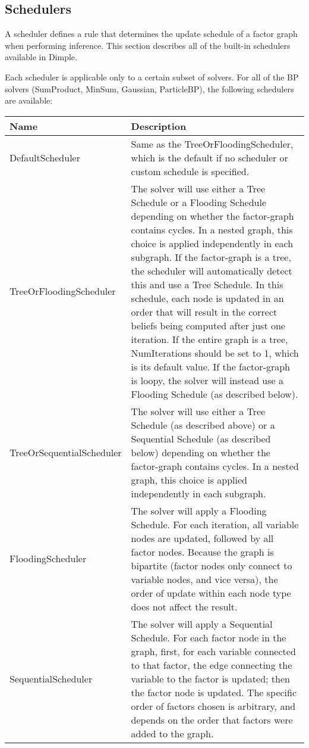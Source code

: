 \subsection{Schedulers}
\label{sec:Schedulers}

A scheduler defines a rule that determines the update schedule of a factor graph when performing inference.  This section describes all of the built-in schedulers available in Dimple.

Each scheduler is applicable only to a certain subset of solvers.  For all of the BP solvers (SumProduct, MinSum, Gaussian, ParticleBP), the following schedulers are available:

\begin{longtable}{l p{4in}}
\textbf{Name} & \textbf{Description} \\ \hline \hline
%
\textsf{DefaultScheduler} & Same as the TreeOrFloodingScheduler, which is the default if no scheduler or custom schedule is specified. \\ \hline
%
\textsf{TreeOrFloodingScheduler} & The solver will use either a Tree Schedule or a Flooding Schedule depending on whether the factor-graph contains cycles.  In a nested graph, this choice is applied independently in each subgraph.  If the factor-graph is a tree, the scheduler will automatically detect this and use a Tree Schedule.  In this schedule, each node is updated in an order that will result in the correct beliefs being computed after just one iteration.  If the entire graph is a tree, NumIterations should be set to 1, which is its default value.  If the factor-graph is loopy, the solver will instead use a Flooding Schedule (as described below). \\ \hline
%
\textsf{TreeOrSequentialScheduler} & The solver will use either a Tree Schedule (as described above) or a Sequential Schedule (as described below) depending on whether the factor-graph contains cycles.  In a nested graph, this choice is applied independently in each subgraph.  \\ \hline
%
\textsf{FloodingScheduler} & The solver will apply a Flooding Schedule.  For each iteration, all variable nodes are updated, followed by all factor nodes.  Because the graph is bipartite (factor nodes only connect to variable nodes, and vice versa), the order of update within each node type does not affect the result. \\ \hline
%
\textsf{SequentialScheduler} & The solver will apply a Sequential Schedule.  For each factor node in the graph, first, for each variable connected to that factor, the edge connecting the variable to the factor is updated; then the factor node is updated.  The specific order of factors chosen is arbitrary, and depends on the order that factors were added to the graph. \\ \hline

\end{longtable}
